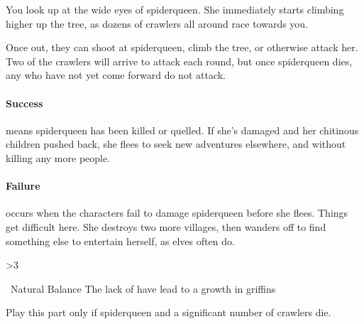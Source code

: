 \begin{boxtext}
  You look up at the wide eyes of \gls{spiderqueen}.
  She immediately starts climbing higher up the tree, as dozens of \glspl{crawler} all around race towards you.
\end{boxtext}

Once out, they can shoot at \gls{spiderqueen}, climb the tree, or otherwise attack her.
Two of the \glspl{crawler} will arrive to attack each round, but once \gls{spiderqueen} dies, any who have not yet come forward do not attack.

\keras

\showStdSpells





\paragraph{Success} means \gls{spiderqueen} has been killed or quelled.
If she's damaged and her chitinous children pushed back, she flees to seek new adventures elsewhere, and without killing any more people.

\paragraph{Failure} occurs when the characters fail to damage \gls{spiderqueen} before she flees.
Things get difficult here.
She destroys two more \glspl{village}, then wanders off to find something else to entertain herself, as elves often do.

\spiderqueen

\showStdSpells[
  
  
  \setcounter{enc}{3}
]

\ifnum\value{cycle}>3
  
\fi


{\squash~Natural Balance}%
{The lack of  have lead to a growth in griffins}%

Play this part only if \gls{spiderqueen} and a significant number of \glspl{crawler} die.


